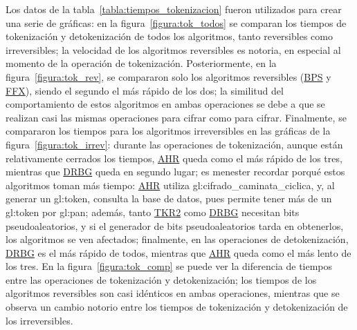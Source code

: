 Los datos de la tabla~\ref{tabla:tiempos_tokenizacion} fueron utilizados para
crear una serie de gráficas: en la figura~\ref{figura:tok_todos} se comparan los
tiempos de tokenización y detokenización de todos los algoritmos, tanto
reversibles como irreversibles; la velocidad de los algoritmos reversibles es
notoria, en especial al momento de la operación de tokenización. Posteriormente,
en la figura~\ref{figura:tok_rev}, se compararon solo los algoritmos reversibles
(\hyperref[sec:bps]{BPS} y \hyperref[sec:ffx]{FFX}), siendo el segundo el más
rápido de los dos; la similitud del comportamiento de estos algoritmos en ambas
operaciones se debe a que se realizan casi las mismas operaciones para cifrar
como para cifrar. Finalmente, se compararon los tiempos para los algoritmos
irreversibles en las gráficas de la figura~\ref{figura:tok_irrev}: durante las
operaciones de tokenización, aunque están relativamente cerrados los tiempos,
\hyperref[sec:ahr]{AHR} queda como el más rápido de los tres, mientras que
\hyperref[sec:drbg_lista]{DRBG} queda en segundo lugar; es menester recordar
porqué estos algoritmos toman más tiempo: \hyperref[sec:ahr]{AHR} utiliza
\gls{gl:cifrado_caminata_ciclica}, y, al generar un \gls{gl:token}, consulta la
base de datos, pues permite tener más de un \gls{gl:token} por \gls{gl:pan};
además, tanto \hyperref[sec:tkr]{TKR2} como \hyperref[sec:drbg_lista]{DRBG}
necesitan bits pseudoaleatorios, y si el generador de bits pseudoaleatorios
tarda en obtenerlos, los algoritmos se ven afectados; finalmente, en las
operaciones de detokenización, \hyperref[sec:drbg_lista]{DRBG} es el más rápido
de todos, mientras que \hyperref[sec:ahr]{AHR} queda como el más lento de los
tres. En la figura~\ref{figura:tok_comp} se puede ver la diferencia de tiempos
entre las operaciones de tokenización y detokenización; los tiempos de los
algoritmos reversibles son casi idénticos en ambas operaciones, mientras que
se observa un cambio notorio entre los tiempos de tokenización y detokenización
de los irreversibles.



